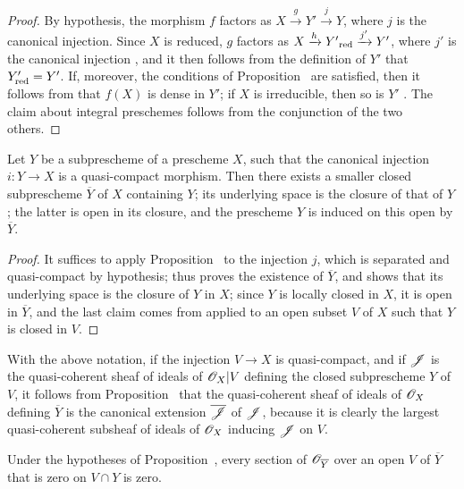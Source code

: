 \begin{proof}
\label{proof-1.9.5.9}
By hypothesis, the morphism $f$ factors as $X\xrightarrow{g}Y'\xrightarrow{j}Y$, where $j$ is the canonical injection.
Since $X$ is reduced, $g$ factors as $X\xrightarrow{h} {Y'}_{\mathrm{red}}\xrightarrow{j'}Y'$, where $j'$ is the canonical injection , and it then follows from the definition of $Y'$ that $Y'_{\mathrm{red}}=Y'$.
If, moreover, the conditions of Proposition~ are satisfied, then it follows from  that $f(X)$ is dense in $Y'$; if $X$ is irreducible, then so is $Y'$ .
The claim about integral preschemes follows from the conjunction of the two others.
\end{proof}

\begin{proposition}[9.5.10]
\label{1.9.5.10}
Let $Y$ be a subprescheme of a prescheme $X$, such that the canonical injection $i:Y\to X$ is a quasi-compact morphism.
Then there exists a smaller closed subprescheme $\overline{Y}$ of $X$ containing $Y$; its underlying space is the closure of that of $Y$; the latter is open in its closure, and the prescheme $Y$ is induced on this open by $\overline{Y}$.
\end{proposition}

\begin{proof}
\label{proof-1.9.5.10}
It suffices to apply Proposition~ to the injection $j$, which is separated  and quasi-compact by hypothesis;  thus proves the existence of $\overline{Y}$, and  shows that its underlying space is the closure of $Y$ in $X$; since $Y$ is locally closed in $X$, it is open in $\overline{Y}$, and the last claim comes from  applied to an open subset $V$ of $X$ such that $Y$ is closed in $V$.
\end{proof}

With the above notation, if the injection $V\to X$ is quasi-compact, and if $\mathscr{J}$ is the quasi-coherent sheaf of ideals of $\mathscr{O}_X|V$ defining the closed subprescheme $Y$ of $V$, it follows from Proposition~ that the quasi-coherent sheaf of ideals of $\mathscr{O}_X$ defining $\overline{Y}$ is the canonical extension  $\overline{\mathscr{J}}$ of $\mathscr{J}$, because it is clearly the largest quasi-coherent subsheaf of ideals of $\mathscr{O}_X$ inducing $\mathscr{J}$ on $V$.

\begin{corollary}[9.5.11]
\label{1.9.5.11}
Under
the hypotheses of Proposition~, every section of $\mathscr{O}_{\overline{Y}}$ over an open $V$ of $\overline{Y}$ that is zero on $V\cap Y$ is zero.
\end{corollary}

